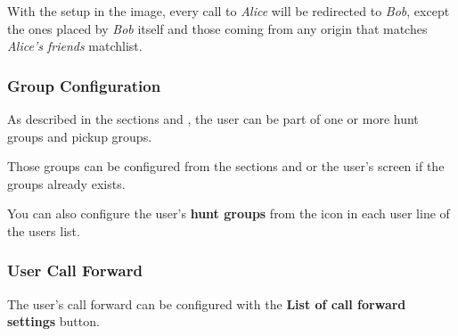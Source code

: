 \documentclass[letterpaper,10pt,spanish]{sphinxmanual}
\begin{document}
With the setup in the image, every call to \emph{Alice} will be redirected to \emph{Bob},
except the ones placed by \emph{Bob} itself and those coming from any origin that matches
\emph{Alice's friends} matchlist.


\subsubsection{Group Configuration}
\label{administration_portal/client/vpbx/users:group-configuration}
As described in the sections {\hyperref[administration_portal/client/vpbx/routing_endpoints/hunt_groups:huntgroups]{}} and {\hyperref[administration_portal/client/vpbx/user_configuration/pick_up_groups:capture\string-groups]{}}, the
user can be part of one or more hunt groups and pickup groups.

Those groups can be configured from the sections {\hyperref[administration_portal/client/vpbx/routing_endpoints/hunt_groups:huntgroups]{}} and
{\hyperref[administration_portal/client/vpbx/user_configuration/pick_up_groups:capture\string-groups]{}} or the user's screen if the groups already exists.

You can also configure the user's \textbf{hunt groups} from the icon in each user
line of the users list.


\subsubsection{User Call Forward}
\label{administration_portal/client/vpbx/users:user-call-forward}
The user's call forward can be configured with the \textbf{List of call forward settings}  button.
\end{document}
